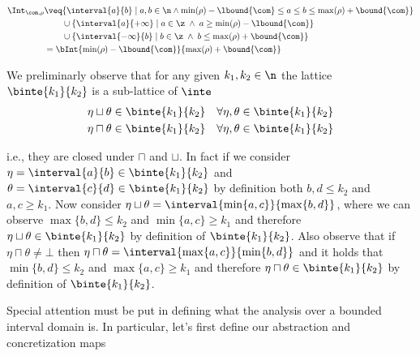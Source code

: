 \begin{align*}
  \Int_{\com,\rho} & \veq \{ \interval{a}{b} \mid a, b \in \n \land
                     \min(\rho) - \lbound{\com} \leq a \leq b \leq \max(\rho) + \bound{\com}\} \\
                   & \phantom{\veq} \cup \{\interval{a}{+\infty} \mid a \in\z \; \land \; a \geq \min(\rho) - \lbound{\com}\} \\
                   & \phantom{\veq} \cup \{\interval{-\infty}{b} \mid b \in\z \; \land \; b \leq \max(\rho) + \bound{\com}\} \\
                   & = \bInt{\min(\rho)-\lbound{\com}}{\max(\rho) + \bound{\com}}
\end{align*}

We preliminarly observe that for any given \(k_1,k_2\in\n\) the
lattice \(\binte{k_1}{k_2}\) is a sub-lattice of \(\inte\)
\begin{align*}
  \eta \sqcup \theta & \in \binte{k_1}{k_2} & \forall \eta,\theta \in \binte{k_1}{k_2} \\
  \eta \sqcap \theta & \in \binte{k_1}{k_2} & \forall \eta,\theta \in \binte{k_1}{k_2} \\
\end{align*}

i.e., they are closed under \(\sqcap\) and \(\sqcup\). In fact if we
consider \({\eta = \interval{a}{b} \in \binte{k_1}{k_2}}\) and
\({\theta = \interval{c}{d} \in \binte{k_1}{k_2}}\) by definition both
\(b,d \leq k_2\) and \(a,c \geq k_1\). Now consider
\({\eta \sqcup \theta = \interval{\min\{a,c\}}{\max\{b,d\}}}\), where
we can observe \(\max\{b,d\} \leq k_2\) and \(\min\{a,c\} \geq k_1\)
and therefore \({\eta \sqcup \theta \in \binte{k_1}{k_2}}\) by
definition of \(\binte{k_1}{k_2}\).  Also observe that if
\(\eta \sqcap \theta \neq \bot\) then
\({\eta \sqcap \theta = \interval{\max\{a,c\}}{\min\{b,d\}}}\) and it
holds that \({\min\{b,d\} \leq k_2}\) and \({\max\{a,c\} \geq k_1}\)
and therefore \({\eta \sqcap \theta \in \binte{k_1}{k_2}}\) by definition of
\(\binte{k_1}{k_2}\).

\medskip

\noindent
Special attention must be put in defining what the analysis over a
bounded interval domain is. In particular, let's first define our
abstraction and concretization maps

